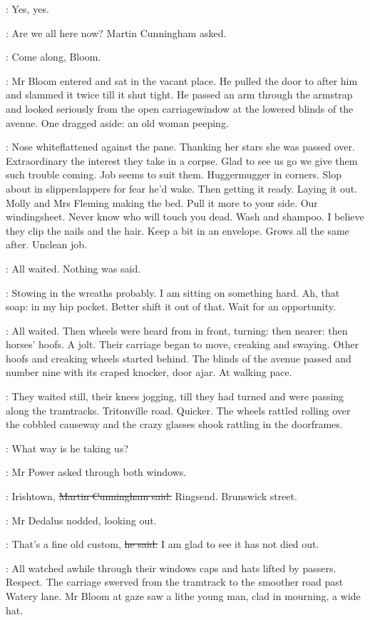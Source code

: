 \simon:
Yes, yes.

\cunningham:
Are we all here now?
Martin Cunningham asked.

\cunningham:
Come along, Bloom.

:
Mr Bloom entered and sat in the vacant place.
He pulled the door to after him
and slammed it twice till it shut tight.
He passed an arm through the armstrap
and looked seriously from the open carriagewindow
at the lowered blinds of the avenue.
One dragged aside:
an old woman peeping.

\BloomInt:
Nose whiteflattened against the pane.
Thanking her stars she was passed over.
Extraordinary the interest they take in a corpse.
Glad to see us go
we give them such trouble coming.
Job seems to suit them.
Huggermugger in corners.
Slop about in slipperslappers for fear he'd wake.
Then getting it ready.
Laying it out.
Molly and Mrs Fleming making the bed.
Pull it more to your side.
Our windingsheet.
Never know who will touch you dead.
Wash and shampoo.
I believe they clip the nails and the hair.
Keep a bit in an envelope.
Grows all the same after.
Unclean job.

:
All waited.
Nothing was said.

\BloomInt:
Stowing in the wreaths probably.
I am sitting on something hard.
Ah, that soap:
in my hip pocket.
Better shift it out of that.
Wait for an opportunity.

:
All waited.
Then wheels were heard from in front, turning:
then nearer:
then horses' hoofs.
A jolt.
Their carriage began to move, creaking and swaying.
Other hoofs and creaking wheels started behind.
The blinds of the avenue passed
and number nine with its craped knocker, door ajar.
At walking pace.

:
They waited still, their knees jogging, till they had turned
and were passing along the tramtracks.
Tritonville road.
Quicker.
The wheels
rattled rolling over the cobbled causeway
and the crazy glasses shook rattling in the doorframes.

\power:
What way is he taking us?

:
Mr Power asked through both windows.

\cunningham:
Irishtown,
\sout{Martin Cunningham said.}
Ringsend.
Brunswick street.

:
Mr Dedalus nodded, looking out.

\Bloom:
That's a fine old custom,
\sout{he said.}
I am glad to see it has not died out.

:
All watched awhile through their windows
caps and hats lifted by passers.
Respect.
The carriage swerved from the tramtrack to the smoother road past Watery lane.
Mr Bloom at gaze saw a lithe young man,
clad in mourning, a wide hat.

